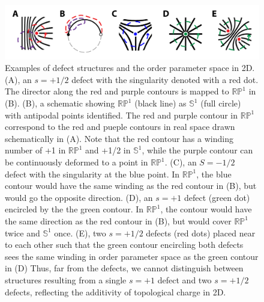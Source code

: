 \begin{figure}[h]
  \centering
  \includegraphics{figures/C2/Ch2-Figs_2DMeas.png}
  \caption{Examples of defect structures and the order parameter space in 2D.
  (A), an $s=+1/2$ defect with the singularity denoted with a red dot.
  The director along the red and purple contours is mapped to $\mathbb{R}\mathbb{P}^1$ in (B).
  (B), a schematic showing $\mathbb{R}\mathbb{P}^1$ (black line) as $\mathbb{S}^1$ (full circle) with antipodal points identified.
  The red and purple contour in $\mathbb{R}\mathbb{P}^1$ correspond to the red and pueple contours in real space drawn schematically in (A).
  Note that the red contour has a winding number of +1 in $\mathbb{R}\mathbb{P}^1$ and +1/2 in $\mathbb{S}^1$, while the purple contour can be continuously deformed to a point in $\mathbb{R}\mathbb{P}^1$.
  (C), an $S = -1/2$ defect with the singularity at the blue point.
  In $\mathbb{R}\mathbb{P}^1$, the blue contour would have the same winding as the red contour in (B), but would go the opposite direction.
  (D), an $s = +1$ defect (green dot) encircled by the the green contour.
  In $\mathbb{R}\mathbb{P}^1$, the contour would have the same direction as the red contour in (B), but would cover $\mathbb{R}\mathbb{P}^1$ twice and $\mathbb{S}^1$ once.
  (E), two $s = +1/2$ defects (red dots) placed near to each other such that the green contour encircling both defects sees the same winding in order parameter space as the green contour in (D)
  Thus, far from the defects, we cannot distinguish between structures resulting from a single $s = +1$ defect and two $s = +1/2$ defects, reflecting the additivity of topological charge in 2D.}\label{f:2-2DMeas}
\end{figure}

